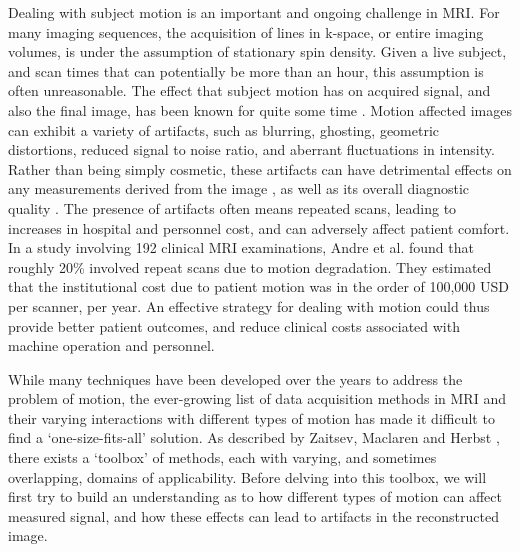 \documentclass[class=article, crop=false]{standalone}
\begin{document}
Dealing with subject motion is an important and ongoing challenge in MRI. For many imaging sequences, the acquisition of lines in k-space, or entire imaging volumes, is under the assumption of stationary spin density. Given a live subject, and scan times that can potentially be more than an hour, this assumption is often unreasonable. The effect that subject motion has on acquired signal, and also the final image, has been known for quite some time \parencite{Wood2014}. Motion affected images can exhibit a variety of artifacts, such as blurring, ghosting, geometric distortions, reduced signal to noise ratio, and aberrant fluctuations in intensity. Rather than being simply cosmetic, these artifacts can have detrimental effects on any measurements derived from the image \parencite{Gedamu2012,LeBihan2006,Reuter2015a}, as well as its overall diagnostic quality \parencite{Dantendorfer1997}. The presence of artifacts often means repeated scans, leading to increases in hospital and personnel cost, and can adversely affect patient comfort. In a study involving 192 clinical MRI examinations, Andre et al. \parencite*{Andre2015} found that roughly 20\% involved repeat scans due to motion degradation. They estimated that the institutional cost due to patient motion was in the order of 100,000 USD per scanner, per year. An effective strategy for dealing with motion could thus provide better patient outcomes, and reduce clinical costs associated with machine operation and personnel.
\par
While many techniques have been developed over the years to address the problem of motion, the ever-growing list of data acquisition methods in MRI and their varying interactions with different types of motion has made it difficult to find a ‘one-size-fits-all’ solution. As described by Zaitsev, Maclaren and Herbst \parencite*{Zaitsev2015a}, there exists a ‘toolbox’ of methods, each with varying, and sometimes overlapping, domains of applicability. Before delving into this toolbox, we will first try to build an understanding as to how different types of motion can affect measured signal, and how these effects can lead to artifacts in the reconstructed image.
\end{document}
